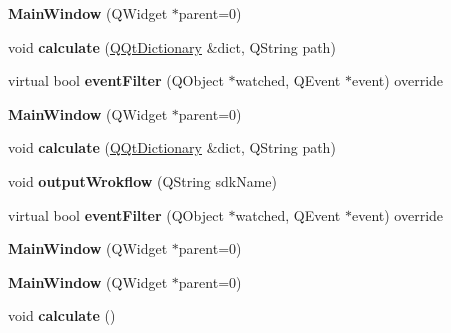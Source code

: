 \begin{DoxyCompactItemize}
\mbox{\label{class_main_window_a8b244be8b7b7db1b08de2a2acb9409db}} 
{\bfseries Main\+Window} (Q\+Widget $\ast$parent=0)
\item 
\mbox{\label{class_main_window_a8772ece01bc01e360707433a433621d0}} 
void {\bfseries calculate} (\mbox{\hyperlink{class_q_qt_dictionary}{Q\+Qt\+Dictionary}} \&dict, Q\+String path)
\item 
\mbox{\label{class_main_window_a0b72fa4df0e4e4ec57d3e03907373177}} 
virtual bool {\bfseries event\+Filter} (Q\+Object $\ast$watched, Q\+Event $\ast$event) override
\item 
\mbox{\label{class_main_window_a8b244be8b7b7db1b08de2a2acb9409db}} 
{\bfseries Main\+Window} (Q\+Widget $\ast$parent=0)
\item 
\mbox{\label{class_main_window_a8772ece01bc01e360707433a433621d0}} 
void {\bfseries calculate} (\mbox{\hyperlink{class_q_qt_dictionary}{Q\+Qt\+Dictionary}} \&dict, Q\+String path)
\item 
\mbox{\label{class_main_window_ade7015edd2fcb6c2f7bbe7b757015d20}} 
void {\bfseries output\+Wrokflow} (Q\+String sdk\+Name)
\item 
\mbox{\label{class_main_window_a0b72fa4df0e4e4ec57d3e03907373177}} 
virtual bool {\bfseries event\+Filter} (Q\+Object $\ast$watched, Q\+Event $\ast$event) override
\item 
\mbox{\label{class_main_window_a8b244be8b7b7db1b08de2a2acb9409db}} 
{\bfseries Main\+Window} (Q\+Widget $\ast$parent=0)
\item 
\mbox{\label{class_main_window_a8b244be8b7b7db1b08de2a2acb9409db}} 
{\bfseries Main\+Window} (Q\+Widget $\ast$parent=0)
\item 
\mbox{\label{class_main_window_a4b38a476cdbf687427aa53aa248878ee}} 
void {\bfseries calculate} ()
\item 
\mbox{\label{class_main_window_a8b244be8b7b7db1b08de2a2acb9409db}} 

\end{DoxyCompactItemize}
